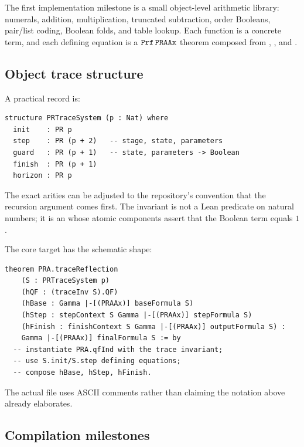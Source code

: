 The first implementation milestone is a small object-level arithmetic
library: numerals, addition, multiplication, truncated subtraction, order
Booleans, pair/list coding, Boolean folds, and table lookup.  Each function is
a concrete  term, and each defining equation is a
\(\mathtt{Prf}\,\mathtt{PRAAx}\) theorem composed from ,
, and .

\subsection{Object trace structure}

A practical record is:
\begin{lstlisting}[language={}]
structure PRTraceSystem (p : Nat) where
  init    : PR p
  step    : PR (p + 2)   -- stage, state, parameters
  guard   : PR (p + 1)   -- state, parameters -> Boolean
  finish  : PR (p + 1)
  horizon : PR p
\end{lstlisting}
The exact arities can be adjusted to the repository's convention that the
recursion argument comes first.  The invariant is not a Lean predicate on
natural numbers; it is an  whose atomic components assert that
the Boolean  term equals \(1\).

The core target has the schematic shape:
\begin{lstlisting}[language={}]
theorem PRA.traceReflection
    (S : PRTraceSystem p)
    (hQF : (traceInv S).QF)
    (hBase : Gamma |-[(PRAAx)] baseFormula S)
    (hStep : stepContext S Gamma |-[(PRAAx)] stepFormula S)
    (hFinish : finishContext S Gamma |-[(PRAAx)] outputFormula S) :
    Gamma |-[(PRAAx)] finalFormula S := by
  -- instantiate PRA.qfInd with the trace invariant;
  -- use S.init/S.step defining equations;
  -- compose hBase, hStep, hFinish.
\end{lstlisting}
The actual file uses ASCII comments rather than claiming the notation above
already elaborates.

\subsection{Compilation milestones}

